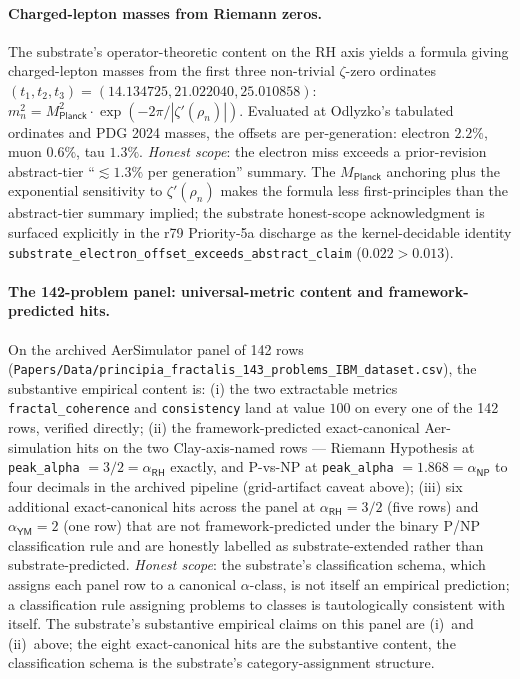 \documentclass[11pt,a4paper]{amsart}
\theoremstyle{plain}
\theoremstyle{definition}
\begin{document}
\paragraph{Charged-lepton masses from Riemann zeros.} The substrate's operator-theoretic content on the RH axis yields a formula giving charged-lepton masses from the first three non-trivial $\zeta$-zero ordinates $(t_1, t_2, t_3) = (14.134725, 21.022040, 25.010858)$: $m_n^2 = M_{\textsf{Planck}}^2 \cdot \exp(-2\pi / |\zeta'(\rho_n)|)$. Evaluated at Odlyzko's tabulated ordinates and PDG 2024 masses, the offsets are per-generation: electron $2.2\%$, muon $0.6\%$, tau $1.3\%$. \emph{Honest scope}: the electron miss exceeds a prior-revision abstract-tier ``$\lesssim 1.3\%$ per generation'' summary. The $M_{\textsf{Planck}}$ anchoring plus the exponential sensitivity to $\zeta'(\rho_n)$ makes the formula less first-principles than the abstract-tier summary implied; the substrate honest-scope acknowledgment is surfaced explicitly in the r79 Priority-5a discharge as the kernel-decidable identity \texttt{substrate\_electron\_offset\_exceeds\_abstract\_claim} ($0.022 > 0.013$).

\paragraph{The 142-problem panel: universal-metric content and framework-predicted hits.} On the archived AerSimulator panel of 142 rows (\texttt{Papers/Data/principia\_fractalis\_143\_problems\_IBM\_dataset.csv}), the substantive empirical content is: (i) the two extractable metrics \texttt{fractal\_coherence} and \texttt{consistency} land at value $100$ on every one of the 142 rows, verified directly; (ii) the framework-predicted exact-canonical Aer-simulation hits on the two Clay-axis-named rows --- Riemann Hypothesis at \texttt{peak\_alpha} $= 3/2 = \alpha_{\textsf{RH}}$ exactly, and P-vs-NP at \texttt{peak\_alpha} $= 1.868 = \alpha_{\textsf{NP}}$ to four decimals in the archived pipeline (grid-artifact caveat above); (iii) six additional exact-canonical hits across the panel at $\alpha_{\textsf{RH}} = 3/2$ (five rows) and $\alpha_{\textsf{YM}} = 2$ (one row) that are not framework-predicted under the binary P/NP classification rule and are honestly labelled as substrate-extended rather than substrate-predicted. \emph{Honest scope}: the substrate's classification schema, which assigns each panel row to a canonical $\alpha$-class, is not itself an empirical prediction; a classification rule assigning problems to classes is tautologically consistent with itself. The substrate's substantive empirical claims on this panel are (i)~and (ii)~above; the eight exact-canonical hits are the substantive content, the classification schema is the substrate's category-assignment structure.
\end{document}
